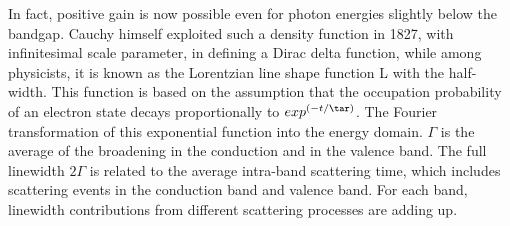 In fact, positive gain is now possible even for photon energies slightly below
the bandgap. Cauchy himself exploited such a density function in 1827, with
infinitesimal scale parameter, in defining a Dirac delta function, while among
physicists, it is known as the Lorentzian line shape function L with the
half-width. This function is based on the assumption that the occupation
probability of an electron state decays proportionally to ${exp}^{(-t/\tar)}$. The Fourier
transformation of this exponential function into the energy domain.
$\Gamma$ is the average of the broadening in the conduction and in the valence
band. The full linewidth $2\Gamma$ is related to the average intra-band scattering
time, which includes scattering events in the conduction band and valence band. For
each band, linewidth contributions from different scattering processes are
adding up.

%
